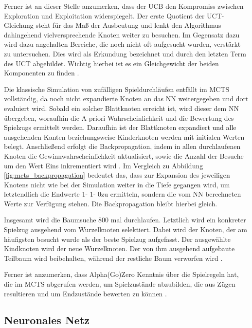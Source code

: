 \documentclass[12pt,a4paper]{article}
\begin{document}
Ferner ist an dieser Stelle anzumerken, dass der UCB den Kompromiss zwischen Exploration und Exploitation widerspiegelt. Der erste Quotient der UCT-Gleichung steht für das Maß der Ausbeutung und lenkt den Algorithmus dahingehend vielversprechende Knoten weiter zu besuchen. Im Gegensatz dazu wird dazu angehalten Bereiche, die noch nicht oft aufgesucht wurden, verstärkt zu untersuchen. Dies wird als Erkundung bezeichnet und durch den letzten Term des UCT abgebildet. Wichtig hierbei ist es ein Gleichgewicht der beiden Komponenten zu finden \cite{Browne2012}.

Die klassische Simulation von zufälligen Spieldurchläufen entfällt im MCTS vollständig, da noch nicht expandierte Knoten an das NN weitergegeben und dort evaluiert wird. Sobald ein solcher Blattknoten erreicht ist, wird dieser dem NN übergeben, woraufhin die A-priori-Wahrscheinlichkeit und die Bewertung des Spielzugs ermittelt werden. Daraufhin ist der Blattknoten expandiert und alle ausgehenden Kanten beziehungsweise Kinderknoten werden mit initialen Werten belegt.
Anschließend erfolgt die Backpropagation, indem in allen durchlaufenen Knoten die Gewinnwahrscheinlichkeit aktualisiert, sowie die Anzahl der Besuche um den Wert Eins inkrementiert wird \cite{Silver2017}. Im Vergleich zu Abbildung \ref{fig:mcts_backpropagation} bedeutet das, dass zur Expansion des jeweiligen Knotens nicht wie bei der Simulation weiter in die Tiefe gegangen wird, um letztendlich die Endwerte \glqq{}1\grqq - \glqq{}1\grqq - \glqq{}0\grqq zu ermitteln, sondern die vom NN berechneten Werte zur Verfügung stehen. Die Backpropagation bleibt hierbei gleich.

Insgesamt wird die Baumsuche 800 mal durchlaufen\cite{SilverHubert2017}. Letztlich wird ein konkreter Spielzug ausgehend vom Wurzelknoten selektiert. Dabei wird der Knoten, der am häufigsten besucht wurde als der beste Spielzug aufgefasst. Der ausgewählte Kindknoten wird der neue Wurzelknoten. Der von ihm ausgehend aufgebaute Teilbaum wird beibehalten, während der restliche Baum verworfen wird \cite{Silver2017}.

Ferner ist anzumerken, dass Alpha(Go)Zero Kenntnis über die Spielregeln hat, die im MCTS abgerufen werden, um Spielzustände abzubilden, die aus Zügen resultieren und um Endzustände bewerten zu können \cite{Silver2017} \cite{SilverHubert2017}. 

\newpage
\subsection{Neuronales Netz}
\end{document}
